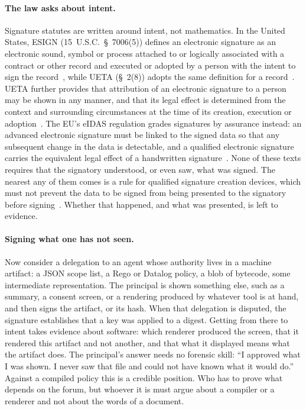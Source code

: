 \documentclass[10pt,twocolumn]{article}
\theoremstyle{plain}
\theoremstyle{definition}
\begin{document}
\paragraph{The law asks about intent.}
Signature statutes are written around intent, not mathematics. In the United States, ESIGN (15~U.S.C.~\S~7006(5)) defines an electronic signature as an electronic sound, symbol or process attached to or logically associated with a contract or other record and executed or adopted by a person with the intent to sign the record~\cite{esign2000}, while UETA (\S~2(8)) adopts the same definition for a record~\cite{ueta1999}. UETA further provides that attribution of an electronic signature to a person may be shown in any manner, and that its legal effect is determined from the context and surrounding circumstances at the time of its creation, execution or adoption~\cite[\S~9]{ueta1999}. The EU's eIDAS regulation grades signatures by assurance instead: an advanced electronic signature must be linked to the signed data so that any subsequent change in the data is detectable, and a qualified electronic signature carries the equivalent legal effect of a handwritten signature~\cite[Arts.~25--26]{eidas2014}. None of these texts requires that the signatory understood, or even saw, what was signed. The nearest any of them comes is a rule for qualified signature creation devices, which must not prevent the data to be signed from being presented to the signatory before signing~\cite[Annex~II]{eidas2014}. Whether that happened, and what was presented, is left to evidence.

\paragraph{Signing what one has not seen.}
Now consider a delegation to an agent whose authority lives in a machine artifact: a JSON scope list, a Rego or Datalog policy, a blob of bytecode, some intermediate representation. The principal is shown something else, such as a summary, a consent screen, or a rendering produced by whatever tool is at hand, and then signs the artifact, or its hash. When that delegation is disputed, the signature establishes that a key was applied to a digest. Getting from there to intent takes evidence about software: which renderer produced the screen, that it rendered this artifact and not another, and that what it displayed means what the artifact does. The principal's answer needs no forensic skill: ``I approved what I was shown. I never saw that file and could not have known what it would do.'' Against a compiled policy this is a credible position. Who has to prove what depends on the forum, but whoever it is must argue about a compiler or a renderer and not about the words of a document.
\end{document}
